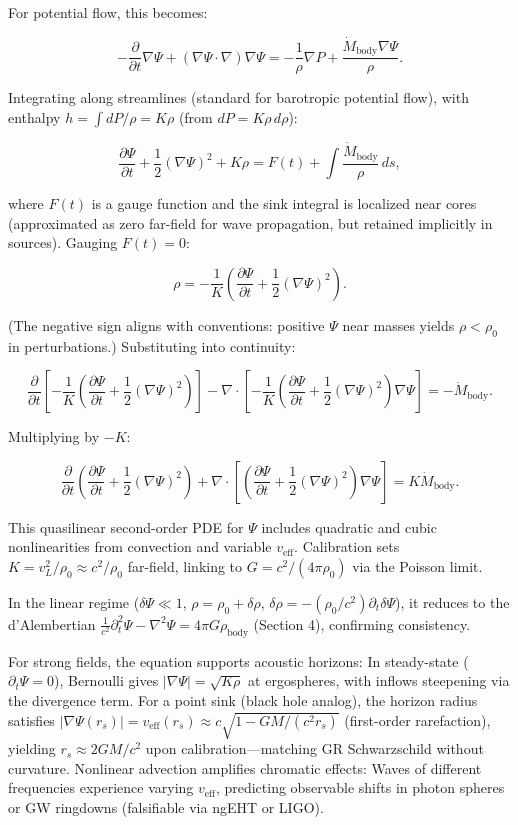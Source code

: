 \documentclass{article}
\begin{document}
For potential flow, this becomes:

\[
-\frac{\partial}{\partial t} \nabla \Psi + (\nabla \Psi \cdot \nabla) \nabla \Psi = -\frac{1}{\rho} \nabla P + \frac{\dot{M}_{\text{body}} \nabla \Psi}{\rho}.
\]

Integrating along streamlines (standard for barotropic potential flow), with enthalpy $h = \int dP / \rho = K \rho$ (from $dP = K \rho \, d\rho$):

\[
\frac{\partial \Psi}{\partial t} + \frac{1}{2} (\nabla \Psi)^2 + K \rho = F(t) + \int \frac{\dot{M}_{\text{body}}}{\rho} \, ds,
\]

where $F(t)$ is a gauge function and the sink integral is localized near cores (approximated as zero far-field for wave propagation, but retained implicitly in sources). Gauging $F(t) = 0$:

\[
\rho = -\frac{1}{K} \left( \frac{\partial \Psi}{\partial t} + \frac{1}{2} (\nabla \Psi)^2 \right).
\]

(The negative sign aligns with conventions: positive $\Psi$ near masses yields $\rho < \rho_0$ in perturbations.) Substituting into continuity:

\[
\frac{\partial}{\partial t} \left[ -\frac{1}{K} \left( \frac{\partial \Psi}{\partial t} + \frac{1}{2} (\nabla \Psi)^2 \right) \right] - \nabla \cdot \left[ -\frac{1}{K} \left( \frac{\partial \Psi}{\partial t} + \frac{1}{2} (\nabla \Psi)^2 \right) \nabla \Psi \right] = -\dot{M}_{\text{body}}.
\]

Multiplying by $-K$:

\[
\frac{\partial}{\partial t} \left( \frac{\partial \Psi}{\partial t} + \frac{1}{2} (\nabla \Psi)^2 \right) + \nabla \cdot \left[ \left( \frac{\partial \Psi}{\partial t} + \frac{1}{2} (\nabla \Psi)^2 \right) \nabla \Psi \right] = K \dot{M}_{\text{body}}.
\]

This quasilinear second-order PDE for $\Psi$ includes quadratic and cubic nonlinearities from convection and variable $v_{\text{eff}}$. Calibration sets $K = v_L^2 / \rho_0 \approx c^2 / \rho_0$ far-field, linking to $G = c^2 / (4\pi \rho_0)$ via the Poisson limit.

In the linear regime ($\delta \Psi \ll 1$, $\rho = \rho_0 + \delta \rho$, $\delta \rho = -(\rho_0 / c^2) \partial_t \delta \Psi$), it reduces to the d'Alembertian $\frac{1}{c^2} \partial_t^2 \Psi - \nabla^2 \Psi = 4\pi G \rho_{\text{body}}$ (Section 4), confirming consistency.

For strong fields, the equation supports acoustic horizons: In steady-state ($\partial_t \Psi = 0$), Bernoulli gives $|\nabla \Psi| = \sqrt{K \rho}$ at ergospheres, with inflows steepening via the divergence term. For a point sink (black hole analog), the horizon radius satisfies $|\nabla \Psi(r_s)| = v_{\text{eff}}(r_s) \approx c \sqrt{1 - GM/(c^2 r_s)}$ (first-order rarefaction), yielding $r_s \approx 2GM/c^2$ upon calibration—matching GR Schwarzschild without curvature. Nonlinear advection amplifies chromatic effects: Waves of different frequencies experience varying $v_{\text{eff}}$, predicting observable shifts in photon spheres or GW ringdowns (falsifiable via ngEHT or LIGO).
\end{document}
